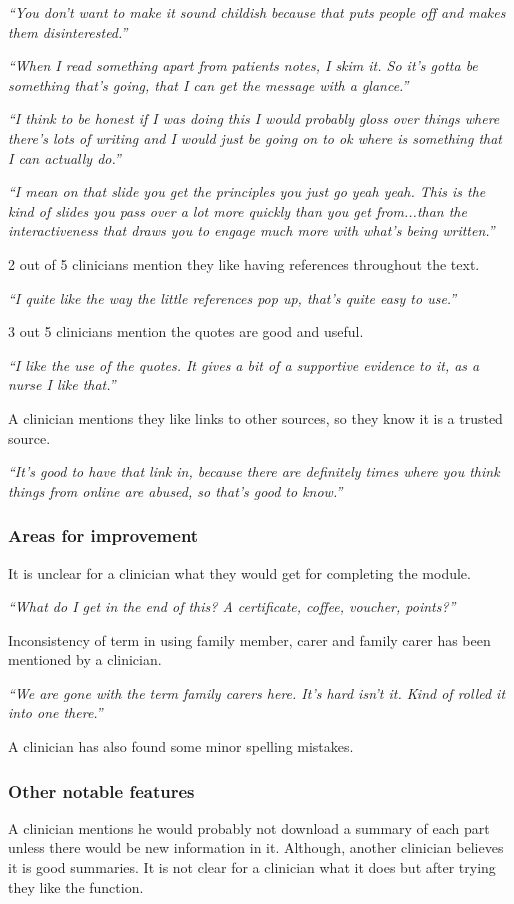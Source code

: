 \documentclass{sigchi}
\begin{document}
\textit{“You don’t want to make it sound childish because that puts people off and makes them disinterested.”}

\textit{“When I read something apart from patients notes, I skim it. So it’s gotta be something that’s going, that I can get the message with a glance.”}

\textit{“I think to be honest if I was doing this I would probably gloss over things where there’s lots of writing and I would just be going on to ok where is something that I can actually do.”}

\textit{“I mean on that slide you get the principles you just go yeah yeah. This is the kind of slides you pass over a lot more quickly than you get from...than the interactiveness that draws you to engage much more with what’s being written.”}

2 out of 5 clinicians mention they like having references throughout the text.

\textit{“I quite like the way the little references pop up, that’s quite easy to use.”}

3 out 5 clinicians mention the quotes are good and useful.

\textit{“I like the use of the quotes. It gives a bit of a supportive evidence to it, as a nurse I like that.”}

A clinician mentions they like links to other sources, so they know it is a trusted source.

\textit{“It’s good to have that link in, because there are definitely times where you think things from online are abused, so that’s good to know.”}

\subsubsection{Areas for improvement}
It is unclear for a clinician what they would get for completing the module.

\textit{“What do I get in the end of this? A certificate, coffee, voucher, points?”}

Inconsistency of term in using family member, carer and family carer has been mentioned by a clinician.

\textit{“We are gone with the term family carers here. It’s hard isn’t it. Kind of rolled it into one there.”}

A clinician has also found some minor spelling mistakes.

\subsubsection{Other notable features}
A clinician mentions he would probably not download a summary of each part unless there would be new information in it. Although, another clinician believes it is good summaries. It is not clear for a clinician what it does but after trying they like the function.
\end{document}
